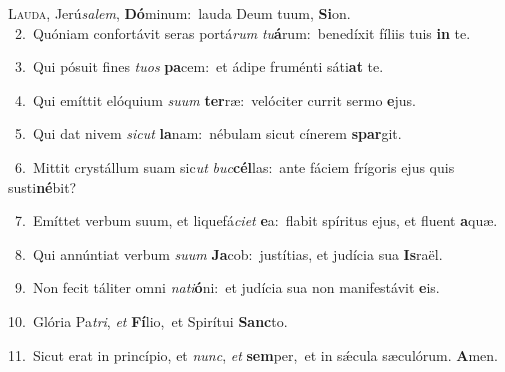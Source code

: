 \lettrine{\initial\textcolor{\initialcolor}{L}}{auda,} Jerú\-\textit{sa}\-\textit{lem}, \textbf{Dó}\-minum:~\star lauda Deum tuum, \textbf{Si}\-on.\\
{\numbfont\textcolor{\numbcolor}{~2.}}~Quóniam confortávit seras portá\textit{rum} \textit{tu}\-\textbf{á}rum:~\star benedíxit fíliis tuis \textbf{in} te.\par
{\numbfont\textcolor{\numbcolor}{~3.}}~Qui pósuit fines \textit{tu}\-\textit{os} \textbf{pa}\-cem:~\star et ádipe fruménti sáti\textbf{at} te.\par
{\numbfont\textcolor{\numbcolor}{~4.}}~Qui emíttit elóquium \textit{su}\-\textit{um} \textbf{ter}\-ræ:~\star velóciter currit sermo \textbf{e}\-jus.\par
{\numbfont\textcolor{\numbcolor}{~5.}}~Qui dat nivem \textit{sic}\-\textit{ut} \textbf{la}\-nam:~\star nébulam sicut cínerem \textbf{spar}\-git.\par
{\numbfont\textcolor{\numbcolor}{~6.}}~Mittit crystállum suam sic\textit{ut} \textit{buc}\-\textbf{cél}las:~\star ante fáciem frígoris ejus quis susti\-\textbf{né}\-bit?\par
{\numbfont\textcolor{\numbcolor}{~7.}}~Emíttet verbum suum, et liquefá\-\textit{ci}\-\textit{et} \textbf{e}\-a:~\star flabit spíritus ejus, et fluent \textbf{a}\-quæ.\par
{\numbfont\textcolor{\numbcolor}{~8.}}~Qui annúntiat verbum \textit{su}\-\textit{um} \textbf{Ja}\-cob:~\star justítias, et judícia sua \textbf{Is}\-raël.\par
{\numbfont\textcolor{\numbcolor}{~9.}}~Non fecit táliter omni \textit{na}\-\textit{ti}\textbf{ó}ni:~\star et judícia sua non manifestávit \textbf{e}\-is.\par
{\numbfont\textcolor{\numbcolor}{10.}}~Glória Pa\-\textit{tri}\-, \textit{et} \textbf{Fí}\-lio,~\star et Spirítui \textbf{Sanc}\-to.\par
{\numbfont\textcolor{\numbcolor}{11.}}~Sicut erat in princípio, et \textit{nunc}\-, \textit{et} \textbf{sem}\-per,~\star et in sǽcula sæculórum. \textbf{A}\-men.\par
